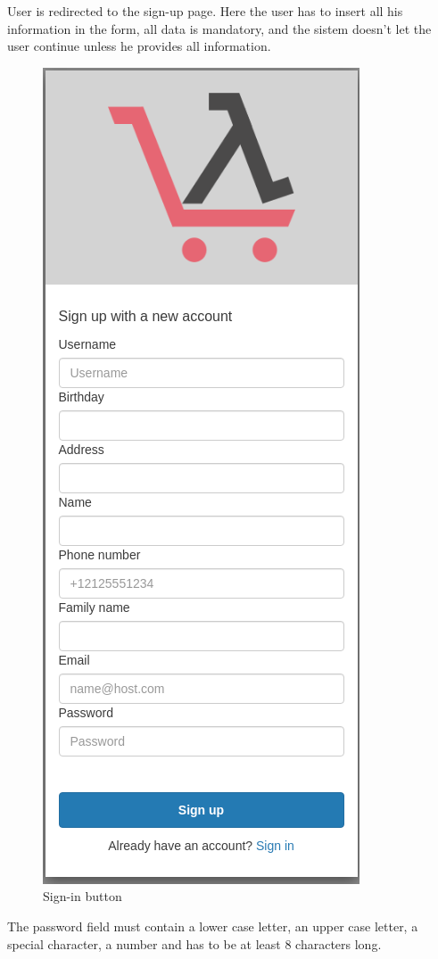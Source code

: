 User is redirected to the sign-up page. Here the user has to insert all his information in the form, all data is mandatory, and the sistem doesn't let the user continue unless he provides all information. \begin{figure}[!ht]
    \caption{Sign-in button}
    \vspace{10px}
    \includegraphics[scale=0.2]{../../../../Images/userManual/signUp.png}
    \centering
\end{figure}The password field must contain a lower case letter, an upper case letter, a special character, a number and has to be at least 8 characters long.
